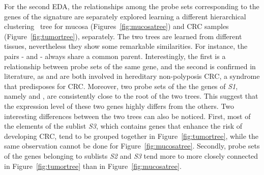 For the second EDA, the relationships among the probe sets corresponding to the genes of the signature are separately explored learning a different hierarchical clustering~\cite{friedman2001elements} tree for mucosa (Figures~\ref{fig:mucosatree}) and CRC samples (Figure~\ref{fig:tumortree}), separately.
The two trees are learned from different tissues, nevertheless they show some remarkable similarities. For instance, the pairs \tp- and \msh- always share a common parent. Interestingly, the first is a relationship between probe sets of the same gene, and the second is confirmed in literature, as \msh and \pms are both involved in hereditary non-polyposis CRC, a syndrome that predisposes for CRC.
Moreover, two probe sets of the the genes of \emph{S1}, namely \apc and \ctnnb, are consistently close to the root of the two trees. This suggest that the expression level of these two genes highly differs from the others.
Two interesting differences between the two trees can also be noticed. First, most of the elements of the sublist \emph{S3}, which contains genes that enhance the risk of developing CRC, tend to be grouped together in Figure~\ref{fig:tumortree}, while the same observation cannot be done for Figure~\ref{fig:mucosatree}. Secondly, probe sets of the genes belonging to sublists \emph{S2} and \emph{S3} tend more to more closely connected in Figure~\ref{fig:tumortree} than in Figure~\ref{fig:mucosatree}.

